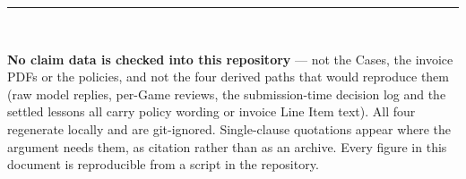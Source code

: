 \documentclass[9pt,a4paper,twocolumn]{article}
\begin{document}
\vspace{0.3em}
\noindent\rule{\linewidth}{0.4pt}\\[0.15em]
{\footnotesize\textbf{No claim data is checked into this repository} --- not the Cases, the invoice
PDFs or the policies, and not the four derived paths that would reproduce them (raw model replies,
per-Game reviews, the submission-time decision log and the settled lessons all carry policy wording
or invoice Line Item text). All four regenerate locally and are git-ignored. Single-clause
quotations appear where the argument needs them, as citation rather than as an archive.
Every figure in this document is reproducible from a script in the repository.\par}
\end{document}
